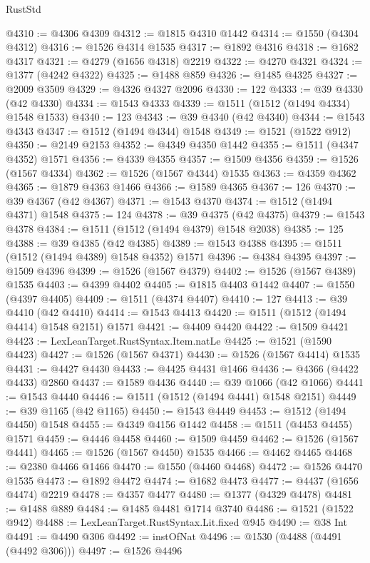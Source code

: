 \begin{lexlean}{RustStd}
\begin{coremodule}
{{@4310 := @4306 @4309
@4312 := @1815 @4310 @1442
@4314 := @1550 (@4304 @4312)
@4316 := @1526 @4314 @1535
@4317 := @1892 @4316
@4318 := @1682 @4317
@4321 := @4279 (@1656 @4318) @2219
@4322 := @4270 @4321
@4324 := @1377 (@4242 @4322)
@4325 := @1488 @859
@4326 := @1485 @4325
@4327 := @2009 @3509
@4329 := @4326 @4327 @2096
@4330 := 122
@4333 := @39 @4330 (@42 @4330)
@4334 := @1543 @4333
@4339 := @1511 (@1512 (@1494 @4334) @1548 @1533)
@4340 := 123
@4343 := @39 @4340 (@42 @4340)
@4344 := @1543 @4343
@4347 := @1512 (@1494 @4344) @1548
@4349 := @1521 (@1522 @912)
@4350 := @2149 @2153
@4352 := @4349 @4350 @1442
@4355 := @1511 (@4347 @4352) @1571
@4356 := @4339 @4355
@4357 := @1509 @4356
@4359 := @1526 (@1567 @4334)
@4362 := @1526 (@1567 @4344) @1535
@4363 := @4359 @4362
@4365 := @1879 @4363 @1466
@4366 := @1589 @4365
@4367 := 126
@4370 := @39 @4367 (@42 @4367)
@4371 := @1543 @4370
@4374 := @1512 (@1494 @4371) @1548
@4375 := 124
@4378 := @39 @4375 (@42 @4375)
@4379 := @1543 @4378
@4384 := @1511 (@1512 (@1494 @4379) @1548 @2038)
@4385 := 125
@4388 := @39 @4385 (@42 @4385)
@4389 := @1543 @4388
@4395 := @1511 (@1512 (@1494 @4389) @1548 @4352) @1571
@4396 := @4384 @4395
@4397 := @1509 @4396
@4399 := @1526 (@1567 @4379)
@4402 := @1526 (@1567 @4389) @1535
@4403 := @4399 @4402
@4405 := @1815 @4403 @1442
@4407 := @1550 (@4397 @4405)
@4409 := @1511 (@4374 @4407)
@4410 := 127
@4413 := @39 @4410 (@42 @4410)
@4414 := @1543 @4413
@4420 := @1511 (@1512 (@1494 @4414) @1548 @2151) @1571
@4421 := @4409 @4420
@4422 := @1509 @4421
@4423 := LexLeanTarget.RustSyntax.Item.natLe
@4425 := @1521 (@1590 @4423)
@4427 := @1526 (@1567 @4371)
@4430 := @1526 (@1567 @4414) @1535
@4431 := @4427 @4430
@4433 := @4425 @4431 @1466
@4436 := @4366 (@4422 @4433) @2860
@4437 := @1589 @4436
@4440 := @39 @1066 (@42 @1066)
@4441 := @1543 @4440
@4446 := @1511 (@1512 (@1494 @4441) @1548 @2151)
@4449 := @39 @1165 (@42 @1165)
@4450 := @1543 @4449
@4453 := @1512 (@1494 @4450) @1548
@4455 := @4349 @4156 @1442
@4458 := @1511 (@4453 @4455) @1571
@4459 := @4446 @4458
@4460 := @1509 @4459
@4462 := @1526 (@1567 @4441)
@4465 := @1526 (@1567 @4450) @1535
@4466 := @4462 @4465
@4468 := @2380 @4466 @1466
@4470 := @1550 (@4460 @4468)
@4472 := @1526 @4470 @1535
@4473 := @1892 @4472
@4474 := @1682 @4473
@4477 := @4437 (@1656 @4474) @2219
@4478 := @4357 @4477
@4480 := @1377 (@4329 @4478)
@4481 := @1488 @889
@4484 := @1485 @4481 @1714 @3740
@4486 := @1521 (@1522 @942)
@4488 := LexLeanTarget.RustSyntax.Lit.fixed @945
@4490 := @38 Int
@4491 := @4490 @306
@4492 := instOfNat
@4496 := @1530 (@4488 (@4491 (@4492 @306)))
@4497 := @1526 @4496
}}
\end{coremodule}
\end{lexlean}
